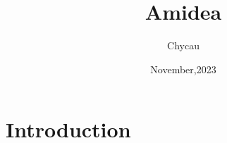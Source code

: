 \documentclass[black]{amidea}
\title{Amidea}
\subtitle{}
\author{Chycau}
\date{November,2023}
\begin{document}
\maketitle

\chapter{Introduction}
\end{document}
